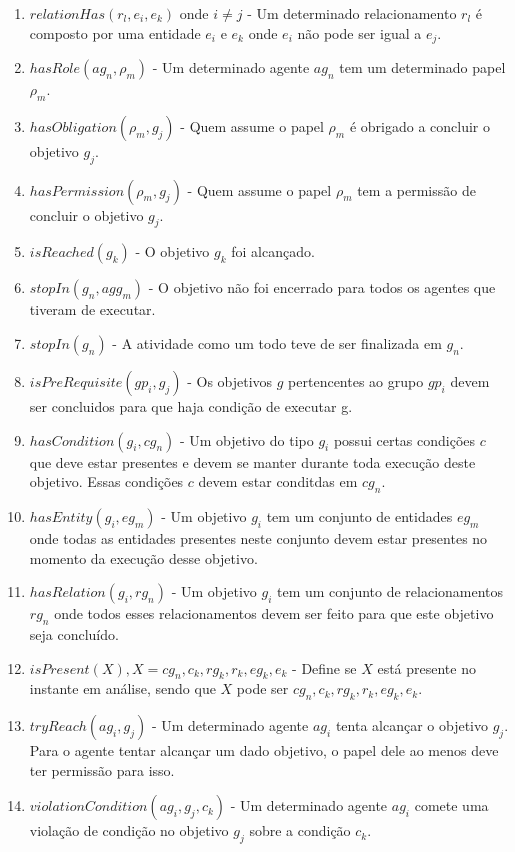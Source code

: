 \documentclass[12pt]{article}
\begin{document}
\begin{enumerate}
	\item $relationHas(r_l,e_i,e_k)$ onde $i \neq j$ - Um determinado relacionamento $r_l$ é composto por uma entidade $e_i$ e $e_k$ onde $e_i$ não pode ser igual a $e_j$.	
	\item $hasRole(ag_n,\rho_m)$ - Um determinado agente $ag_n$ tem um determinado papel $\rho_m$.
	\item $hasObligation(\rho_m,g_j)$ - Quem assume o papel $\rho_m$ é obrigado a concluir o objetivo $g_j$.
	\item $hasPermission(\rho_m,g_j)$ - Quem assume o papel $\rho_m$ tem a permissão de concluir o objetivo $g_j$.
	\item $isReached(g_k)$ - O objetivo $g_k$ foi alcançado.
	\item $stopIn(g_n,agg_m)$ - O objetivo não foi encerrado para todos os agentes que tiveram de executar. 	 				
	\item $stopIn(g_n)$ - A atividade como um todo teve de ser finalizada em $g_n$.	 			
	\item $isPreRequisite(gp_i,g_j)$ - Os objetivos $g$ pertencentes ao grupo $gp_i$ devem ser concluidos para que haja condição de executar g.
	\item $hasCondition(g_i,cg_n)$ - Um objetivo do tipo $g_i$ possui certas condições $c$ que deve estar presentes e devem se manter durante toda execução deste objetivo. Essas condições $c$ devem estar conditdas em $cg_n$. 
	\item $hasEntity(g_i,eg_m)$ - Um objetivo $g_i$ tem um conjunto de entidades $eg_m$ onde todas as entidades presentes neste conjunto devem estar presentes no momento da execução desse objetivo.
	\item $hasRelation(g_i,rg_n)$ - Um objetivo $g_i$ tem um conjunto de relacionamentos $rg_n$ onde todos esses relacionamentos devem ser feito para que este objetivo seja concluído.
	\item $isPresent(X), X = cg_n,c_k,rg_k,r_k,eg_k,e_k$ - Define se $X$ está presente no instante em análise, sendo que $X$ pode ser $cg_n,c_k,rg_k,r_k,eg_k,e_k$.
	\item $tryReach(ag_i,g_j)$ - Um determinado agente $ag_i$ tenta alcançar o objetivo $g_j$. Para o agente tentar alcançar um dado objetivo, o papel dele ao menos deve ter permissão para isso.  
	\item $violationCondition(ag_i,g_j,c_k)$ - Um determinado agente $ag_i$ comete uma violação de condição no objetivo $g_j$ sobre a condição $c_k$. 

\end{enumerate}
\end{document}
